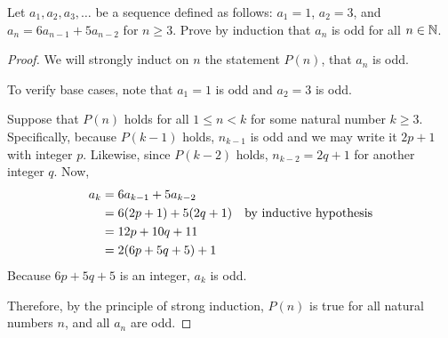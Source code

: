 \question Let $a_1, a_2, a_3, \dots$ be a sequence defined as follows: $a_1 = 1$, $a_2 = 3$, and $a_n = 6a_{n-1} + 5a_{n-2}$ for $n \geq 3$.
Prove by induction that $a_n$ is odd for all $n\in\mathbb{N}$.
\begin{proof}
  We will strongly induct on $n$ the statement $P(n)$, that $a_n$ is odd.

  To verify base cases, note that $a_1=1$ is odd and $a_2=3$ is odd.

  Suppose that $P(n)$ holds for all $1 \leq n < k$ for some natural number $k \geq 3$.
  Specifically, because $P(k-1)$ holds, $n_{k-1}$ is odd and we may write it $2p+1$ with integer $p$.
  Likewise, since $P(k-2)$ holds, $n_{k-2} = 2q+1$ for another integer $q$. Now,
  \begin{align*}
    a_k & = 6a_{k-1} + 5a_{k-2}   \\
        & = 6(2p+1) + 5(2q+1) & \text{by inductive hypothesis} \\
        & = 12p+10q+11            \\
        & = 2(6p+5q+5) + 1
  \end{align*}
  Because $6p+5q+5$ is an integer, $a_k$ is odd.

  Therefore, by the principle of strong induction,
  $P(n)$ is true for all natural numbers $n$, and all $a_n$ are odd.
\end{proof}


